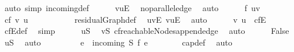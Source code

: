 \begin{isabellebody}
\ {\isacharparenleft}auto\ simp{\isacharcolon}\ incoming{\isacharprime}{\isacharunderscore}def{\isacharparenright}\isanewline
\ \ \ \ \isamarkupfalse%
\ {\isachardoublequoteopen}{\isacharparenleft}v{\isacharcomma}u{\isacharparenright}{\isasymnotin}E{\isachardoublequoteclose}\ \isamarkupfalse%
\ no{\isacharunderscore}parallel{\isacharunderscore}edge\ \isamarkupfalse%
\ auto\isanewline
\isanewline
\ \ \ \ \isamarkupfalse%
\ {\isachardoublequoteopen}f\ {\isacharparenleft}u{\isacharcomma}v{\isacharparenright}\ {\isasymnoteq}\ {}{\isachardoublequoteclose}\isanewline
\ \ \ \ \isamarkupfalse%
\ {\isachardoublequoteopen}cf\ {\isacharparenleft}v{\isacharcomma}\ u{\isacharparenright}\ {\isasymnoteq}\ {}{\isachardoublequoteclose}\ \isanewline
\ \ \ \ \ \ \isamarkupfalse%
\ residualGraph{\isacharunderscore}def\ \isamarkupfalse%
\ {\isacartoucheopen}{\isacharparenleft}u{\isacharcomma}v{\isacharparenright}{\isasymin}E{\isacartoucheclose}\ {\isacartoucheopen}{\isacharparenleft}v{\isacharcomma}u{\isacharparenright}{\isasymnotin}E{\isacartoucheclose}\ \isamarkupfalse%
\ auto\isanewline
\ \ \ \ \isamarkupfalse%
\ {\isachardoublequoteopen}{\isacharparenleft}v{\isacharcomma}\ u{\isacharparenright}\ {\isasymin}\ cf{\isachardot}E{\isachardoublequoteclose}\ \isamarkupfalse%
\ cf{\isachardot}E{\isacharunderscore}def\ \isamarkupfalse%
\ simp\isanewline
\ \ \ \ \isamarkupfalse%
\ {\isachardoublequoteopen}u{\isasymin}{\isacharquery}S{\isachardoublequoteclose}\ \isamarkupfalse%
\ {\isacartoucheopen}v{\isasymin}{\isacharquery}S{\isacartoucheclose}\ cf{\isachardot}reachableNodes{\isacharunderscore}append{\isacharunderscore}edge\ \isamarkupfalse%
\ auto\isanewline
\ \ \ \ \isamarkupfalse%
\ False\ \isamarkupfalse%
\ {\isacartoucheopen}u{\isasymnotin}{\isacharquery}S{\isacartoucheclose}\ \isamarkupfalse%
\ auto\isanewline
\ \ \isamarkupfalse%
\ \ \isanewline
\ \ \isamarkupfalse%
\ {\isachardoublequoteopen}{\isacharparenleft}{\isasymSum}e\ {\isasymin}\ incoming{\isacharprime}\ {\isacharquery}S{\isachardot}\ f\ e{\isacharparenright}\ {\isacharequal}\ {}{\isachardoublequoteclose}\isanewline
\ \ \ \ \isamarkupfalse%
\ cap{\isacharunderscore}def\ \isamarkupfalse%
\ auto\isanewline
\ \ \isamarkupfalse%

\end{isabellebody}
